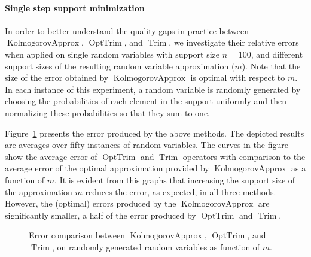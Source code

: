 \documentclass{article}
\DeclareMathOperator{\Trim}{Trim}
\DeclareMathOperator{\KlmApprox}{KolmogorovApprox}
\DeclareMathOperator{\OptTrim}{OptTrim}
\begin{document}
	\paragraph{Single step support minimization}
	In order to better understand the quality gaps in practice between $\KlmApprox$, $\OptTrim$, and $\Trim$, we investigate their relative errors when applied on single random variables with support size $n = 100$, and different support sizes of the resulting random variable approximation ($m$). Note that the size of the error obtained by $\KlmApprox$ is optimal with respect to $m$. In each instance of this experiment, a random variable is randomly generated by choosing the probabilities of each element in the support uniformly and then normalizing these probabilities so that they sum to one.
	
	Figure~\ref{fig:error} presents the error produced by the above methods. The depicted results are averages over fifty instances of random variables. The curves in the figure show the average error of $\OptTrim$ and $\Trim$ operators with comparison to the average error of the optimal approximation provided by $\KlmApprox$ as a function of $m$. It is evident from this graphs that increasing the support size of the approximation $m$ reduces the error, as expected, in all three methods. However, the (optimal) errors produced by the $\KlmApprox$ are significantly smaller, a half of the error produced by $\OptTrim$ and $\Trim$.
	
	\begin{figure}[htb]
		\scriptsize	
		\centering 
		\caption{Error comparison between $\KlmApprox$, $\OptTrim$, and $\Trim$, on randomly generated random variables as function of $m$.}
		\label{fig:error}
	\end{figure}
	
\end{document}

